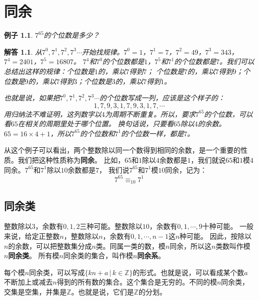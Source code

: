 \documentclass[12pt,UTF8]{ctexbook}
\newtheorem{ex}{例子}[section]
\newtheorem*{so}{解答}
\begin{document}




\chapter{同余}
\begin{ex}\label{ex:3-0-0}
    $7^{65}$的个位数是多少？
\end{ex}
\begin{so}
    从$7^0,7^1,7^2,7^3\cdots$开始找规律。$7^0=1$，$7^1=7$，$7^2=49$，$7^3=343$，$7^4=2401$，$7^5=16807$。
    $7^4$和$7^0$的个位数都是$1$，$7^5$和$7^1$的个位数都是$7$。我们可以总结出这样的规律：个位数是$1$的，乘以$7$得到$7$；
    个位数是$7$的，乘以$7$得到$9$；个位数是$9$的，乘以$7$得到$3$；个位数是$3$的，乘以$7$得到$1$。

    也就是说，如果把$7^0,7^1,7^2,7^3\cdots$的个位数写成一列，应该是这个样子的：
    $$ 1, 7, 9, 3, 1, 7, 9, 3, 1, 7, \cdots$$
    用归纳法不难证明，这列数字以$4$为周期不断重复。所以，要求$7^{65}$的个位数，可以看$65$在相关的周期里处于哪个位置。
    换句话说，只要看$65$除以$4$的余数。$65 = 16 \times 4 + 1$，所以$7^{65}$的个位数和$7^1$的个位数一样，都是$7$。
\end{so}

从这个例子可以看出，两个整数除以同一个数得到相同的余数，是一个重要的性质。我们把这种性质称为\textbf{同余}。
比如，$65$和$1$除以$4$余数都是$1$，我们就说$65$和$1$模$4$同余。$7^{65}$和$7^1$除以$10$余数都是$7$，
我们说$7^{65}$和$7^1$模$10$同余，记为：
$$ 7^{65} \equiv_{10} 7^1 $$

\section{同余类}
整数除以$3$，余数有$0,1,2$三种可能。整数除以$10$，余数有$0,1,\cdots , 9$十种可能。
一般来说，给定正整数$n$，整数除以$n$，余数有$0,1,\cdots , n-1$这$n$种可能。
因此，按除以$n$的余数，可以把整数集分成$n$类。同属一类的数，模$n$同余，所以这$n$类数叫作模$n$\textbf{同余类}。
所有模$n$同余类的集合，叫作模$n$\textbf{同余系}。

每个模$n$同余类，可以写成$\{kn + a \, | \, k\in\mathbb{Z} \}$的形式。也就是说，可以看成某个数$a$不断加上或减去$n$得到的所有数的集合。这个集合是无穷的。不同的模$n$同余类，交集是空集，并集是$\mathbb{Z}$。也就是说，它们是$\mathbb{Z}$的分划。
\end{document}
